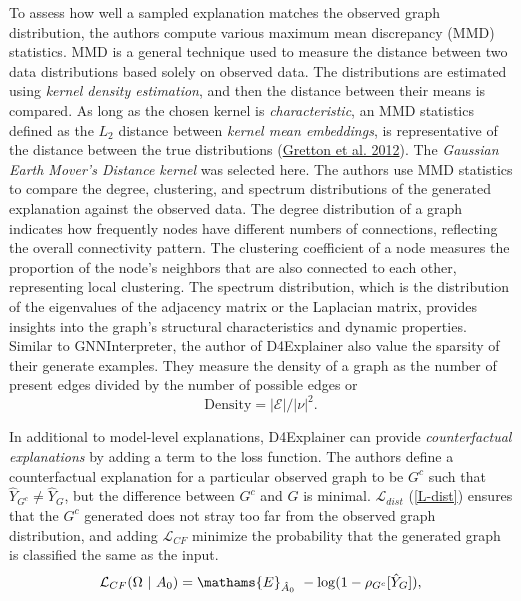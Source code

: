 \documentclass[
  11pt,
  letterpaper,
]{article}
\begin{document}
\quad To assess how well a sampled explanation matches the observed
graph distribution, the authors compute various maximum mean discrepancy
(MMD) statistics. MMD is a general technique used to measure the
distance between two data distributions based solely on observed data.
The distributions are estimated using \emph{kernel density estimation},
and then the distance between their means is compared. As long as the
chosen kernel is \emph{characteristic}, an MMD statistics defined as the
\(L_2\) distance between \emph{kernel mean embeddings}, is
representative of the distance between the true distributions
(\protect\hyperlink{ref-Gretton_Borgwardt_Rasch_Schuxf6lkopf_Smola_2012}{Gretton
et al. 2012}). The \emph{Gaussian Earth Mover's Distance kernel} was
selected here. The authors use MMD statistics to compare the degree,
clustering, and spectrum distributions of the generated explanation
against the observed data. The degree distribution of a graph indicates
how frequently nodes have different numbers of connections, reflecting
the overall connectivity pattern. The clustering coefficient of a node
measures the proportion of the node's neighbors that are also connected
to each other, representing local clustering. The spectrum distribution,
which is the distribution of the eigenvalues of the adjacency matrix or
the Laplacian matrix, provides insights into the graph's structural
characteristics and dynamic properties. Similar to GNNInterpreter, the
author of D4Explainer also value the sparsity of their generate
examples. They measure the density of a graph as the number of present
edges divided by the number of possible edges or \begin{equation}
    \text{Density} = \mathcal{|E|} / |\nu|^2. 
\end{equation}

\quad In additional to model-level explanations, D4Explainer can provide
\emph{counterfactual explanations} by adding a term to the loss
function. The authors define a counterfactual explanation for a
particular observed graph to be \(G^c\) such that
\(\hat Y_{G^c} \neq \hat Y_G\), but the difference between \(G^c\) and
\(G\) is minimal. \(\mathcal{L}_{dist}\) (\ref{L-dist}) ensures that the
\(G^c\) generated does not stray too far from the observed graph
distribution, and adding \(\mathcal{L}_{CF}\) minimize the probability
that the generated graph is classified the same as the input.
\begin{equation}
        \mathcal{L}_{CF}(\Omega \ | \ A_0) = \mathams{E}_{\hat A_0} \ - \log(1 - \rho_{G^c}[\hat Y_{G}]), 
\end{equation}
\end{document}
